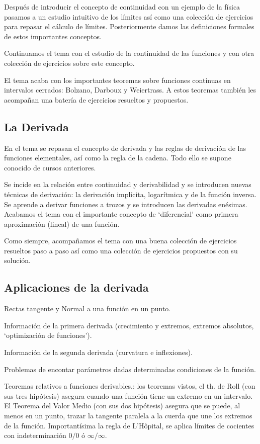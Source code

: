 Después de introducir el concepto de continuidad con un ejemplo de la física pasamos a un estudio intuitivo de los límites así como una colección de ejercicios para repasar el cálculo de límites.  Posteriormente damos las definiciones formales de estos importantes conceptos.

Continuamos el tema con el estudio de la continuidad de las funciones y con otra colección de ejercicios sobre este concepto.

El tema acaba con los importantes teoremas sobre funciones continuas en intervalos cerrados: Bolzano, Darboux y Weiertrass. A estos teoremas también les acompañan una batería de ejercicios resueltos y propuestos.

\subsection{La Derivada}

En el tema se repasan el concepto de derivada y las reglas de derivación de las funciones elementales, así como la regla de la cadena. Todo ello se supone conocido de cursos anteriores.

Se incide en la relación entre continuidad y derivabilidad y se introducen nuevas técnicas de derivación: la derivación implícita, logarítmica y de la función inversa. Se aprende a derivar funciones a trozos y se introducen las derivadas enésimas. Acabamos el tema con el importante concepto de `diferencial' como primera aproximación (lineal) de una función.

Como siempre, acompañamos el tema con una buena colección de ejercicios resueltos paso a paso así como una colección de ejercicios propuestos con su solución.

\subsection{Aplicaciones de la derivada}

Rectas tangente y Normal a una función en un punto.

Información de la primera derivada (crecimiento y extremos, extremos absolutos, `optimización de funciones').

Información de la segunda derivada (curvatura e inflexiones). 

Problemas de encontar parámetros dadas determinadas condiciones de la función.

Teoremas relativos a funciones derivables.:  los teoremas vistos, el th. de Roll (con sus tres hipótesis) asegura cuando una función tiene un extremo en un intervalo. El Teorema del Valor Medio (con sus dos hipótesis) asegura que se puede, al menos en un punto, trazar la tangente paralela a la cuerda que une los extremos de la función. Importantísima la regla de L'Hôpital, se aplica límites de cocientes con indeterminación $0/0$ ó $\infty / \infty$.

